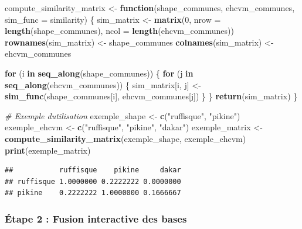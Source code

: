 \documentclass[
]{article}
\newenvironment{Shaded}{\begin{snugshade}}{\end{snugshade}}
\newcommand{\AttributeTok}[1]{\textcolor[rgb]{0.13,0.29,0.53}{#1}}
\newcommand{\CommentTok}[1]{\textcolor[rgb]{0.56,0.35,0.01}{\textit{#1}}}
\newcommand{\ControlFlowTok}[1]{\textcolor[rgb]{0.13,0.29,0.53}{\textbf{#1}}}
\newcommand{\DecValTok}[1]{\textcolor[rgb]{0.00,0.00,0.81}{#1}}
\newcommand{\FunctionTok}[1]{\textcolor[rgb]{0.13,0.29,0.53}{\textbf{#1}}}
\newcommand{\NormalTok}[1]{#1}
\newcommand{\OtherTok}[1]{\textcolor[rgb]{0.56,0.35,0.01}{#1}}
\newcommand{\StringTok}[1]{\textcolor[rgb]{0.31,0.60,0.02}{#1}}
\begin{document}
\begin{Shaded}
\begin{Highlighting}[]
\NormalTok{compute\_similarity\_matrix }\OtherTok{\textless{}{-}} \ControlFlowTok{function}\NormalTok{(shape\_communes, ehcvm\_communes, }\AttributeTok{sim\_func =}\NormalTok{ similarity) \{}
\NormalTok{  sim\_matrix }\OtherTok{\textless{}{-}} \FunctionTok{matrix}\NormalTok{(}\DecValTok{0}\NormalTok{, }\AttributeTok{nrow =} \FunctionTok{length}\NormalTok{(shape\_communes), }\AttributeTok{ncol =} \FunctionTok{length}\NormalTok{(ehcvm\_communes))}
  \FunctionTok{rownames}\NormalTok{(sim\_matrix) }\OtherTok{\textless{}{-}}\NormalTok{ shape\_communes}
  \FunctionTok{colnames}\NormalTok{(sim\_matrix) }\OtherTok{\textless{}{-}}\NormalTok{ ehcvm\_communes}
  
  \ControlFlowTok{for}\NormalTok{ (i }\ControlFlowTok{in} \FunctionTok{seq\_along}\NormalTok{(shape\_communes)) \{}
    \ControlFlowTok{for}\NormalTok{ (j }\ControlFlowTok{in} \FunctionTok{seq\_along}\NormalTok{(ehcvm\_communes)) \{}
\NormalTok{      sim\_matrix[i, j] }\OtherTok{\textless{}{-}} \FunctionTok{sim\_func}\NormalTok{(shape\_communes[i], ehcvm\_communes[j])}
\NormalTok{    \}}
\NormalTok{  \}}
  \FunctionTok{return}\NormalTok{(sim\_matrix)}
\NormalTok{\}}

\CommentTok{\# Exemple d\textquotesingle{}utilisation}
\NormalTok{exemple\_shape }\OtherTok{\textless{}{-}} \FunctionTok{c}\NormalTok{(}\StringTok{"ruffisque"}\NormalTok{, }\StringTok{"pikine"}\NormalTok{)}
\NormalTok{exemple\_ehcvm }\OtherTok{\textless{}{-}} \FunctionTok{c}\NormalTok{(}\StringTok{"ruffisque"}\NormalTok{, }\StringTok{"pikine"}\NormalTok{, }\StringTok{"dakar"}\NormalTok{)}
\NormalTok{exemple\_matrix }\OtherTok{\textless{}{-}} \FunctionTok{compute\_similarity\_matrix}\NormalTok{(exemple\_shape, exemple\_ehcvm)}
\FunctionTok{print}\NormalTok{(exemple\_matrix)}
\end{Highlighting}
\end{Shaded}

\begin{verbatim}
##           ruffisque    pikine     dakar
## ruffisque 1.0000000 0.2222222 0.0000000
## pikine    0.2222222 1.0000000 0.1666667
\end{verbatim}

\hypertarget{uxe9tape-2-fusion-interactive-des-bases}{%
\subsubsection{Étape 2 : Fusion interactive des
bases}\label{uxe9tape-2-fusion-interactive-des-bases}}
\end{document}
